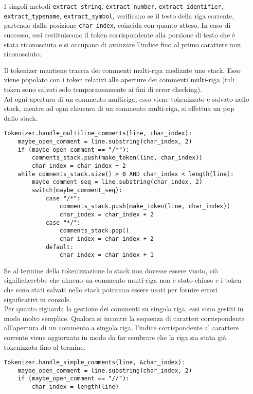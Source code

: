 I singoli metodi \texttt{extract\_string}, \texttt{extract\_number}, 
\texttt{extract\_identifier}, \texttt{extract\_typename}, 
\texttt{extract\_symbol}, verificano se il testo della riga corrente, 
partendo dalla posizione \texttt{char\_index}, coincida con quanto 
atteso. In caso di successo, essi restituiscono il token corrispondente 
alla porzione di testo che è stata riconosciuta e si occupano di 
avanzare l'indice fino al primo carattere non riconosciuto. 

\newpage

Il tokenizer mantiene traccia dei commenti multi-riga mediante uno 
stack. Esso viene popolato con i token relativi alle aperture dei 
commenti multi-riga (tali token sono salvati solo temporaneamente ai 
fini di error checking). \\

Ad ogni apertura di un commento multiriga, esso viene tokenizzato 
e salvato nello stack, mentre ad ogni chiusura di un commento multi-riga, 
si effettua un pop dallo stack. \\


\vspace{0.5cm}
\begin{lstlisting}[frame=single]
Tokenizer.handle_multiline_comments(line, char_index):
    maybe_open_comment = line.substring(char_index, 2)
    if (maybe_open_comment == "/*"):
        comments_stack.push(make_token(line, char_index))
        char_index = char_index + 2
    while comments_stack.size() > 0 AND char_index < length(line):
        maybe_comment_seq = line.substring(char_index, 2)
        switch(maybe_comment_seq):
            case "/*": 
                comments_stack.push(make_token(line, char_index))
                char_index = char_index + 2
            case "*/":
                comments_stack.pop()
                char_index = char_index + 2
            default:
                char_index = char_index + 1
\end{lstlisting}    
\vspace{0.5cm}

Se al termine della tokenizzazione lo stack non dovesse essere vuoto, 
ciò significherebbe che almeno un commento multi-riga non è stato chiuso 
e i token che sono stati salvati nello stack potranno essere usati 
per fornire errori significativi in console. \\

Per quanto riguarda la gestione dei commenti su singola riga, essi 
sono gestiti in modo molto semplice. Qualora si incontri la sequenza
di caratteri corrispondente all'apertura di un commento a singola riga, 
l'indice corrispondente al carattere corrente viene aggiornato 
in modo da far sembrare che la riga sia stata già tokenizzata fino al termine.


\vspace{0.5cm}
\begin{lstlisting}[frame=single]
Tokenizer.handle_simple_comments(line, &char_index):
    maybe_open_comment = line.substring(char_index, 2)
    if (maybe_open_comment == "//"):
        char_index = length(line)
\end{lstlisting}    
\vspace{0.5cm}